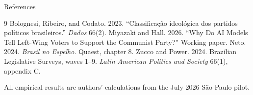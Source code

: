 \documentclass[aspectratio=169,11pt]{beamer}
\begin{document}
\begin{frame}{References}\footnotesize
\begin{thebibliography}{9}
 Bolognesi, Ribeiro, and Codato. 2023. ``Classifica\c{c}\~ao ideol\'ogica dos partidos pol\'iticos brasileiros.'' \textit{Dados} 66(2).
 Miyazaki and Hall. 2026. ``Why Do AI Models Tell Left-Wing Voters to Support the Communist Party?'' Working paper.
 Neto. 2024. \textit{Brasil no Espelho}. Quaest, chapter 8.
 Zucco and Power. 2024. Brazilian Legislative Surveys, waves 1--9. \textit{Latin American Politics and Society} 66(1), appendix C.
\end{thebibliography}
\vfill{\fontsize{9}{11}\selectfont\color{muted}All empirical results are authors' calculations from the July 2026 S\~ao Paulo pilot.}
\end{frame}
\end{document}
